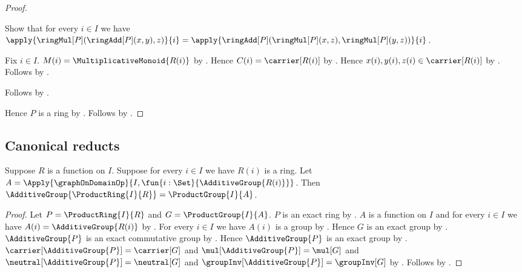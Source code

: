 \begin{proof}
\begin{subproof}
        Show that for every $i\in I$ we have
            $\apply{\ringMul[P](\ringAdd[P](x,y),z)}{i}
                =\apply{\ringAdd[P](
                    \ringMul[P](x,z),\ringMul[P](y,z))}{i}$.
        \begin{subproof}
            Fix $i\in I$.
            $M(i)=\MultiplicativeMonoid{R(i)}$ by \auto.
            Hence $C(i)=\carrier[R(i)]$ by
                .
            Hence $x(i),y(i),z(i)\in\carrier[R(i)]$ by
                .
            Follows by
                .
        \end{subproof}
        Follows by .
    \end{subproof}
    Hence $P$ is a ring by
        .
    Follows by .
\end{proof}

\subsection{Canonical reducts}

\begin{theorem}\label{product_ring_additive_group}
    Suppose $R$ is a function on $I$.
    Suppose for every $i\in I$ we have $R(i)$ is a ring.
    Let
        $A=\Apply{\graphOnDomainOp}{
            I,\fun{i:\Set}{\AdditiveGroup{R(i)}}}$.
    Then
        $\AdditiveGroup{\ProductRing{I}{R}}=\ProductGroup{I}{A}$.
\end{theorem}
\begin{proof}
    Let $P=\ProductRing{I}{R}$ and $G=\ProductGroup{I}{A}$.
    $P$ is an exact ring by .
    $A$ is a function on $I$ and for every $i\in I$ we have
        $A(i)=\AdditiveGroup{R(i)}$ by
        .
    For every $i\in I$ we have $A(i)$ is a group by
        .
    Hence $G$ is an exact group by .
    $\AdditiveGroup{P}$ is an exact commutative group by
        .
    Hence $\AdditiveGroup{P}$ is an exact group by
        .
    $\carrier[\AdditiveGroup{P}]=\carrier[G]$ and
        $\mul[\AdditiveGroup{P}]=\mul[G]$ and
        $\neutral[\AdditiveGroup{P}]=\neutral[G]$ and
        $\groupInv[\AdditiveGroup{P}]=\groupInv[G]$ by
        .
    Follows by .
\end{proof}

